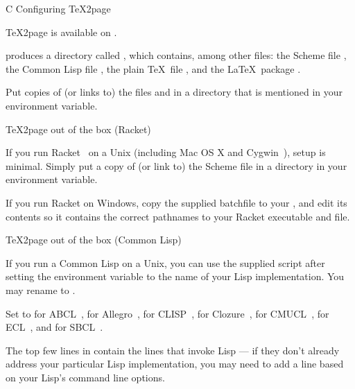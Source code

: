 {{{{{{{{{{{{{{{{{{{


\ifx\inpltdist\Undefined

\beginchapter  C Configuring \TeX2page

%
\TeX2page is available on
.


\n produces a directory
called , which contains, among other files:
the Scheme file , the Common Lisp file , the plain \TeX\ file
, and the \LaTeX\ package
.

Put copies of (or links to) the files
 and   in a directory
that is mentioned in your  environment
variable.

\beginsection \TeX2page out of the box (Racket)

%
If you run Racket~\cite{racket} on a Unix (including Mac OS X and
Cygwin~\cite{cygwin}), setup is minimal.  Simply put a copy of (or link to) the Scheme
file  in a directory in your  environment variable.

If you run Racket on Windows,
copy the supplied batchfile 
to your , and edit its contents so it contains
the correct pathnames to your Racket executable and
 file.


\beginsection \TeX2page out of the box (Common Lisp)

If you run a Common Lisp on a Unix, you can use the supplied script
 after setting the environment variable  to the
name of your Lisp implementation.  You may rename  to
.

Set  to
 for ABCL~\cite{abcl},
 for Allegro~\cite{allegro},
 for CLISP~\cite{clisp},
 for Clozure~\cite{clozure},
 for CMUCL~\cite{cmucl},
 for ECL~\cite{ecl},
and  for SBCL~\cite{sbcl}.

The top few lines in  contain the lines
that invoke Lisp —  if they don’t already address your
particular Lisp
implementation, you may need to add a line based on your
Lisp’s command line options.

}}}}}}}}}}}}}}}}}}}
